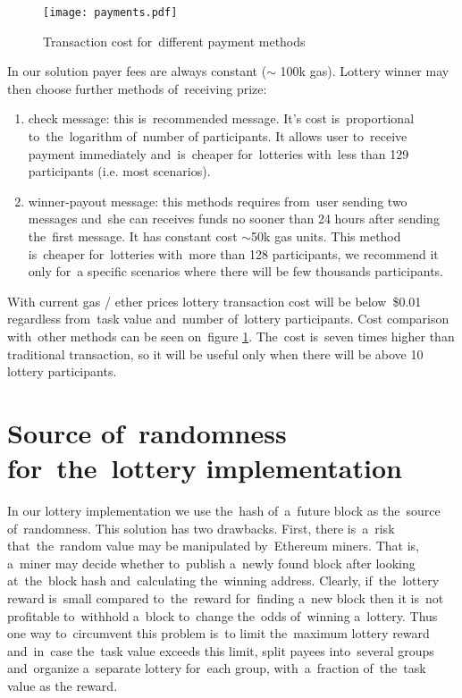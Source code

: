 \documentclass[a4paper]{article}
\begin{document}
    \begin{figure}
        \centering
        \texttt{[image: payments.pdf]}
        \caption{Transaction cost for~different payment methods}
        \label{fig:payment}
    \end{figure}


    In our solution payer fees are always constant ($\sim$ 100k gas).
    Lottery winner may then choose further methods of~receiving prize:
    \begin{enumerate}
        \item check message: this is~recommended message. It's cost is~proportional to~the~logarithm of~number of
            participants. It allows user to~receive payment immediately and~is~cheaper for~lotteries with~less than 129
            participants (i.e. most scenarios).
        \item winner-payout message: this methods requires from~user sending two messages and~she can receives funds no
            sooner than 24 hours after sending the~first message. It has constant cost $\sim$50k gas units.
            This method is~cheaper for~lotteries with~more than 128 participants, we recommend it only for~a specific
            scenarios where there will be few thousands participants.
    \end{enumerate}

    With current gas / ether prices lottery transaction cost will be below~\$0.01 regardless from~task value and~number
    of~lottery participants. Cost comparison with~other methods can be seen on~figure \ref{fig:payment}.
    The~cost is~seven times higher than traditional transaction, so it will be useful only  when there will be above
    10 lottery participants.

\section{Source of~randomness for~the~lottery implementation}
\label{sec:randomness}
    In our lottery implementation we use the~hash of~a~future block as the~source of~randomness. This solution has
    two drawbacks. First, there is~a~risk that~the~random value may be manipulated by~Ethereum miners. That is,
    a~miner may decide whether to~publish a~newly found block after looking at~the~block hash and~calculating
    the~winning address. Clearly, if~the~lottery reward is~small compared to~the~reward for~finding a~new block
    then it is~not profitable to~withhold a~block to~change the~odds of~winning a~lottery. Thus one way to~circumvent
    this problem is~to limit the~maximum lottery reward and~in~case the~task value exceeds this limit, split payees
    into~several groups and~organize a~separate lottery for~each group, with~a~fraction of~the~task value as the
    reward.
\end{document}
